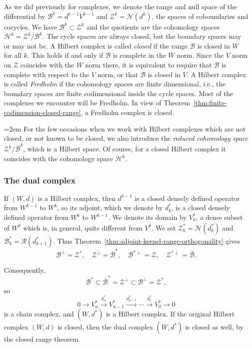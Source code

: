 {As we did previously for complexes, we denote the range and null space of the differential by $\mathcal B^k=d^{k-1}V^{k-1}$ and $\mathcal Z^k=\mathcal N(d^k)$, the spaces of coboundaries and cocycles. We have $\mathcal B^k\subset\mathcal Z^k$ and the quotients are the cohomology spaces $\mathcal H^k=\mathcal Z^k/\mathcal B^k$. The cycle spaces are always closed, but the boundary spaces may or may not be. A Hilbert complex is called \emph{closed} if the range $\mathcal B$ is closed in $W$ for all $k$. This holds if and only if $\mathcal B$ is complete in the $W$ norm. Since the $V$ norm on $\mathcal Z$ coincides with the $W$ norm there, it is equivalent to require that $\mathcal B$ is complete with respect to the $V$ norm, or that $\mathcal B$ is closed in $V$. A Hilbert complex is called \emph{Fredholm} if the cohomology spaces are finite dimensional, i.e., the boundary spaces are finite codimensional inside the cycle spaces. Most of the complexes we encounter will be Fredholm. In view of Theorem~\ref{thm:finite-codimension-closed-range}, a Fredholm complex is closed.}

{\emergencystretch=2em
{For the few occasions when we work with Hilbert complexes which are not closed, or not known to be closed, we also introduce the \emph{reduced cohomology space} $\mathcal Z^k/\overline{\mathcal B}^k$, which is a Hilbert space. Of course, for a closed Hilbert complex it coincides with the cohomology space $\mathcal H^k$.}

\par}
\subsubsection{{The dual complex}}\label{subsec:dual-hilbert-complex}

{If $(W,d)$ is a Hilbert complex, then $d^{k-1}$ is a closed densely defined operator from $W^{k-1}$ to $W^k$, so its adjoint, which we denote by $d_k^*$, is a closed densely defined operator from $W^k$ to $W^{k-1}$. We denote its domain by $V_k^*$, a dense subset of $W^k$ which is, in general, quite different from $V^k$. We set $\mathcal Z_k^*=\mathcal N(d_k^*)$ and $\mathcal B_k^*=\mathcal R(d_{k+1}^*)$. Thus Theorem~\ref{thm:adjoint-kernel-range-orthogonality} gives}
\[
\mathcal B^\perp=\mathcal Z^*,\quad\mathcal Z^\perp=\overline{\mathcal B}^*,\quad\mathcal B^{*\perp}=\mathcal Z,\quad\mathcal Z^{*\perp}=\overline{\mathcal B}.
\]

{Consequently,}
\[
\mathcal B^*\subset\overline{\mathcal B}^*=\mathcal Z^\perp\subset\mathcal B^\perp=\mathcal Z^*,
\]
{so}
\[
0\to V_n^*\xrightarrow{d_n^*}V_{n-1}^*\xrightarrow{d_{n-1}^*}\cdots\xrightarrow{d_1^*}V_0^*\to0
\]
{is a chain complex, and $(W,d^*)$ is a Hilbert complex. If the original Hilbert complex $(W,d)$ is closed, then the dual complex $(W,d^*)$ is closed as well, by the closed range theorem.}
